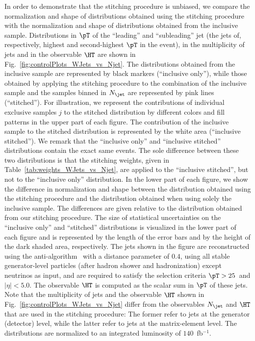 In order to demonstrate that the stitching procedure is unbiased,
we compare the normalization and shape of distributions obtained using the stitching procedure with the normalization and shape of distributions obtained from the inclusive sample.
Distributions in $\pT$ of the ``leading'' and ``subleading'' jet (the jets of, respectively, highest and second-highest $\pT$ in the event),
in the multiplicity of jets and in the observable $\HT$ are shown in Fig.~\ref{fig:controlPlots_WJets_vs_Njet}.
The distributions obtained from the inclusive sample are represented by black markers (``inclusive only''),
while those obtained by applying the stitching procedure to the combination of the inclusive sample and the samples binned in $N_{\jet}$ are represented by pink lines (``stitched'').
For illustration,
we represent the contributions of individual exclusive samples $j$ to the stitched distribution by different colors and fill patterns in the upper part of each figure.
The contribution of the inclusive sample to the stitched distribution is represented by the white area (``inclusive stitched'').
We remark that the ``inclusive only'' and ``inclusive stitched'' distributions contain the exact same events. 
The sole difference between these two distributions 
is that the stitching weights, given in Table~\ref{tab:weights_WJets_vs_Njet},
are applied to the ``inclusive stitched'', but not to the ``inclusive only'' distribution.
In the lower part of each figure, we show the difference in normalization and shape between the distribution obtained using the stitching procedure
and the distribution obtained when using solely the inclusive sample.
The differences are given relative to the distribution obtained from our stitching procedure.
The size of statistical uncertainties on the ``inclusive only'' and ``stitched'' distributions
is visualized in the lower part of each figure and is represented by the length of the error bars and by the height of the dark shaded area, respectively.
The jets shown in the figure are reconstructed using the anti-\kt algorithm~\cite{Cacciari:2008gp,Cacciari:2011ma} with a distance parameter of $0.4$,
using all stable generator-level particles (after hadron shower and hadronization) except neutrinos as input, and are required to satisfy the selection criteria $\pT > 25$~\GeV and $\vert\eta\vert < 5.0$.
The observable $\HT$ is computed as the scalar sum in $\pT$ of these jets.
Note that the multiplicity of jets and the observable $\HT$ shown in Fig.~\ref{fig:controlPlots_WJets_vs_Njet} 
differ from the observables $N_{\jet}$ and $\HT$ that are used in the stitching procedure:
The former refer to jets at the generator (detector) level, while the latter refer to jets at the matrix-element level.
The distributions are normalized to an integrated luminosity of $140$~fb$^{-1}$.

